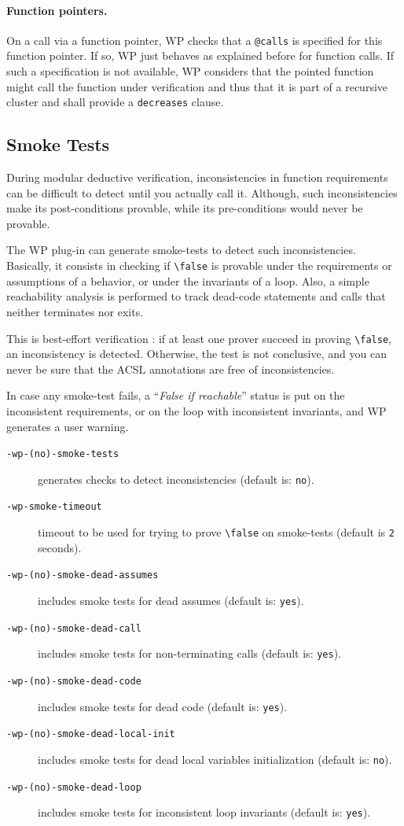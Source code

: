 \paragraph{Function pointers. } On a call via a function pointer, WP checks that
a \verb+@calls+ is specified for this function pointer. If so, WP just behaves
as explained before for function calls. If such a specification is not available,
WP considers that the pointed function might call the function under
verification and thus that it is part of a recursive cluster and shall provide
a \verb+decreases+ clause.

\subsection{Smoke Tests}

During modular deductive verification, inconsistencies in function requirements
can be difficult to detect until you actually call it.
Although, such inconsistencies make its post-conditions provable, while its pre-conditions
would never be provable.

The \textsf{WP} plug-in can generate smoke-tests to detect such inconsistencies.
Basically, it consists in checking if \verb+\false+ is provable under the requirements
or assumptions of a behavior, or under the invariants of a loop. Also, a simple reachability
analysis is performed to track dead-code statements and calls that neither terminates nor exits.

This is best-effort verification : if at least one prover succeed in proving \verb+\false+,
an inconsistency is detected. Otherwise, the test is not conclusive, and you can never be sure
that the ACSL annotations are free of inconsistencies.

In case any smoke-test fails, a ``\textit{False if reachable}'' status is put on the
inconsistent requirements, or on the loop with inconsistent invariants, and
\textsf{WP} generates a user warning.

\begin{description}
\item[\tt -wp-(no)-smoke-tests] generates checks to detect inconsistencies
  (default is: \texttt{no}).
\item[\tt -wp-smoke-timeout] timeout to be used for trying to prove \verb+\false+
  on smoke-tests (default is \verb+2+ seconds).
\item[\tt -wp-(no)-smoke-dead-assumes] includes smoke tests for dead assumes
  (default is: \texttt{yes}).
\item[\tt -wp-(no)-smoke-dead-call] includes smoke tests for non-terminating
  calls (default is: \texttt{yes}).
\item[\tt -wp-(no)-smoke-dead-code] includes smoke tests for dead code (default
  is: \texttt{yes}).
\item[\tt -wp-(no)-smoke-dead-local-init] includes smoke tests for dead local
  variables initialization (default is: \texttt{no}).
\item[\tt -wp-(no)-smoke-dead-loop] includes smoke tests for inconsistent loop
  invariants (default is: \texttt{yes}).
\end{description}


